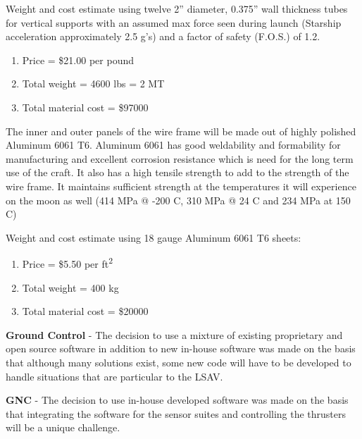 \documentclass[10pt]{article}
\begin{document}
Weight and cost estimate using twelve 2” diameter, 0.375” wall thickness tubes for vertical supports with an assumed max force seen during launch (Starship acceleration approximately 2.5 g’s) and a factor of safety (F.O.S.) of 1.2.
\begin{enumerate}
\item Price = \$21.00 per pound

\item Total weight  = 4600 lbs = 2 MT

\item Total material cost = \$97000
\end{enumerate}

The inner and outer panels of the wire frame will be made out of  highly polished Aluminum 6061 T6.  Aluminum 6061 has good weldability and formability for manufacturing and excellent corrosion resistance which is need for the long term use of the craft.  It also has a high tensile strength to add to the strength of the wire frame. It maintains sufficient strength at the temperatures it will experience on the moon as well (414 MPa @ -200 C, 310 MPa @ 24 C and 234 MPa at 150 C)

Weight and cost estimate using 18 gauge Aluminum 6061 T6 sheets:
\begin{enumerate}
		\item Price = \$5.50 per ft\textsuperscript{2}
		\item Total weight = 400 kg
		\item Total material cost = \$20000 
\end{enumerate}


\textbf{Ground Control} - The decision to use a mixture of existing
proprietary and open source software in addition to new in-house
software was made on the basis that although many solutions exist,
some new code will have to be developed to handle situations that are
particular to the LSAV.

\textbf{GNC} - The decision to use in-house developed software was
made on the basis that integrating the software for the sensor suites
and controlling the thrusters will be a unique challenge. 
\end{document}
